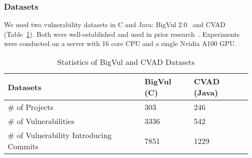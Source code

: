 \subsubsection{\textbf{Datasets}}\label{dataset}

We used two vulnerability datasets in C and Java: BigVul
2.0~\cite{bigvul-msr20} and CVAD~\cite{deepCVA-ase21}
(Table~\ref{dataset:tab}).
Both were well-established and used in prior
research~\cite{bigvul-msr20,fse21,deepCVA-ase21}. Experiments were
conducted on a server with 16 core CPU and a single Nvidia A100 GPU.




\begin{table}[t]
	\caption{Statistics of BigVul and CVAD Datasets}
        \tabcolsep 2.5pt
        \vspace{-10pt}
	\begin{center}
\small
		\renewcommand{\arraystretch}{1}
		\begin{tabular}{l|p{1.5cm}<{\centering}|p{2cm}<{\centering}}
			
        	Datasets	& BigVul (C) & CVAD (Java)\\\hline
		\# of Projects  & 303 & 246 \\\hline
	    \# of Vulnerabilities & 3336 & 542\\\hline
     	\# of Vulnerability Introducing Commits & 7851 & 1229\\\hline

		\end{tabular}
		\label{dataset:tab}
	\end{center}
\end{table}





